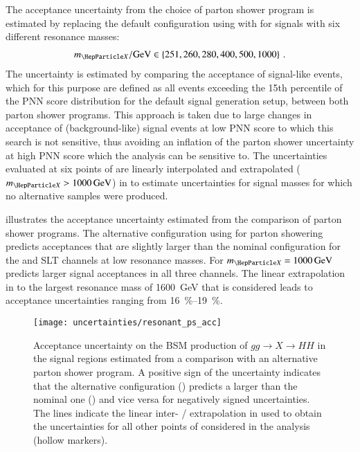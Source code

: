 The acceptance uncertainty from the choice of parton shower program is
estimated by replacing the default configuration using \HERWIG[7.1.3]
with \PYTHIA[8.235] for signals with six different resonance masses:
\begin{align*}
  \mX / \si{\GeV} \in \left\{ 251, 260, 280, 400, 500, 1000
\right\} \,\text{.}
\end{align*}
The uncertainty is estimated by comparing the acceptance of
signal-like events, which for this purpose are defined as all events
exceeding the 15th percentile of the PNN score distribution for the
default signal generation setup, between both parton shower
programs. This approach is taken due to large changes in acceptance of
(background-like) signal events at low PNN score to which this search
is not sensitive, thus avoiding an inflation of the parton shower
uncertainty at high PNN score which the analysis can be sensitive
to. The uncertainties evaluated at six points of \mX are linearly
interpolated and extrapolated ($\mX > \SI{1000}{\GeV}$) in \mX to
estimate uncertainties for signal masses for which no alternative
samples were produced.

 illustrates the acceptance
uncertainty estimated from the comparison of parton shower
programs. The alternative configuration using \PYTHIA for parton
showering predicts acceptances that are slightly larger than the
nominal configuration for the \hadhad and \lephad SLT channels at low
resonance masses. For $\mX = \SI{1000}{\GeV}$ \HERWIG predicts larger
signal acceptances in all three channels. The linear extrapolation in
\mX to the largest resonance mass of \SI{1600}{\GeV} that is
considered leads to acceptance uncertainties ranging from
\SIrange{16}{19}{\percent}.


%   


\begin{figure}[htbp]
  \centering

  \texttt{[image: uncertainties/resonant\_ps\_acc]}

  \caption{Acceptance uncertainty on the BSM production of
    $gg \to X \to HH$ in the signal regions estimated from a
    comparison with an alternative parton shower program. A positive
    sign of the uncertainty indicates that the alternative
    configuration (\PYTHIA) predicts a larger \AccTimesEff than the
    nominal one (\HERWIG) and vice versa for negatively signed
    uncertainties. The lines indicate the linear inter- /
    extrapolation in \mX used to obtain the uncertainties for all
    other points of \mX considered in the analysis (hollow markers).}
  \label{fig:resonant_partonshower}
\end{figure}

